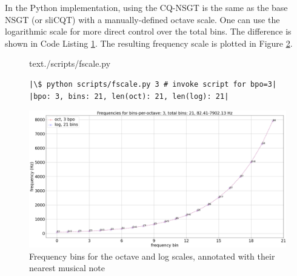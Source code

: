 \documentclass[report.tex]{subfiles}
\begin{document}
In the Python implementation, using the CQ-NSGT is the same as the base NSGT (or sliCQT) with a manually-defined octave scale. One can use the logarithmic scale for more direct control over the total bins. The difference is shown in Code Listing \ref{code:octvlog}. The resulting frequency scale is plotted in Figure \ref{fig:octvlog}.

\begin{figure}[h]
  \centering
 \begin{minipage}{\textwidth}
  \centering
\setlength\partopsep{-\topsep}
\begin{inputminted}[linenos,breaklines,frame=single,firstline=4,lastline=16,fontsize=\scriptsize]{text}{./scripts/fscale.py}
\end{inputminted}
 \vspace{1em}
 \end{minipage}
 \begin{minipage}{\textwidth}
  \centering
\begin{verbatim}
|\$ python scripts/fscale.py 3 # invoke script for bpo=3|
|bpo: 3, bins: 21, len(oct): 21, len(log): 21|
\end{verbatim}
 \end{minipage}
  \label{code:octvlog}
\end{figure}

\begin{figure}[ht]
	\centering
	\includegraphics[width=\textwidth]{./images-freqscales/log_vs_oct.png}
	\caption{Frequency bins for the octave and log scales, annotated with their nearest musical note}
	\label{fig:octvlog}
\end{figure}
\end{document}
